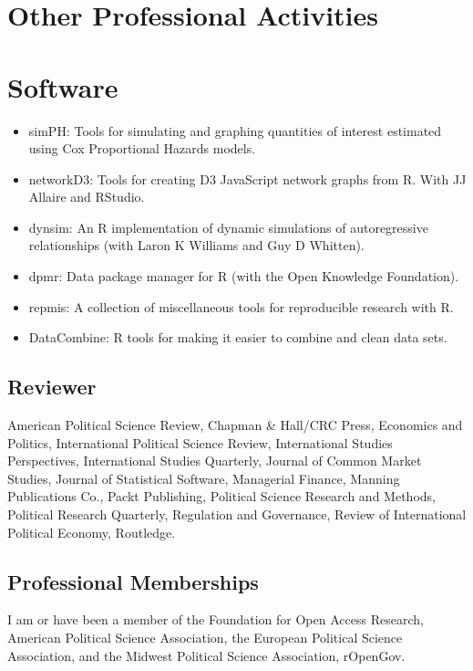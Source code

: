 \documentclass[a4paper]{article}
\begin{document}
{\section*{Other Professional Activities}

\section*{Software}

\begin{itemize}
    \item simPH: Tools for simulating and graphing quantities of interest estimated using Cox Proportional Hazards models.
    \item networkD3: Tools for creating D3 JavaScript network graphs from R. With JJ Allaire and RStudio.
    \item dynsim: An R implementation of dynamic simulations of autoregressive relationships (with Laron K Williams and Guy D Whitten).
    \item dpmr: Data package manager for R (with the Open Knowledge Foundation).
    \item repmis: A collection of miscellaneous tools for reproducible research with R.
    \item DataCombine: R tools for making it easier to combine and clean data sets.
\end{itemize}

\subsection*{Reviewer}

American Political Science Review, Chapman \& Hall/CRC Press, Economics and Politics,
International Political Science Review, International Studies Perspectives, International Studies Quarterly,
Journal of Common Market Studies, Journal of Statistical Software,
Managerial Finance, Manning Publications Co.,
Packt Publishing, Political Science Research and Methods, Political Research
Quarterly, Regulation and Governance, Review of International Political Economy,
Routledge.

\subsection*{Professional Memberships}

I am or have been a member of the Foundation for Open Access Research, American Political Science Association, the European Political Science Association, and the Midwest Political Science Association, rOpenGov.

}
\end{document}
